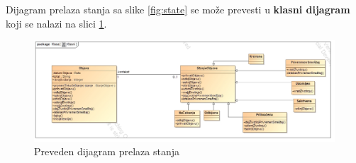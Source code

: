 \par Dijagram prelaza stanja sa slike \ref{fig:state} se može prevesti u \textbf{klasni dijagram} koji se nalazi
na slici \ref{fig:state-class}.
\begin{figure}
    \centering
    \includegraphics[height=0.5\textwidth, width=\textwidth]{img/state-class.jpg}
    \caption{Preveden dijagram prelaza stanja}
    \label{fig:state-class}
\end{figure}

